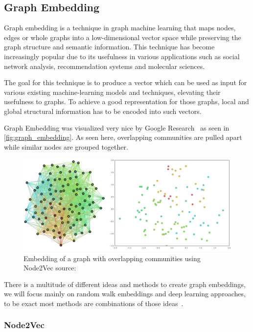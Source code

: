 \subsection{Graph Embedding}
Graph embedding is a technique in graph machine learning that maps nodes, edges or whole graphs into a low-dimensional vector space while preserving the graph structure and semantic information. This technique has become increasingly popular due to its usefulness in various applications such as social network analysis, recommendation systems and molecular sciences.

The goal for this technique is to produce a vector which can be used as input for various existing machine-learning models and techniques, elevating their usefulness to graphs. To achieve a good representation for those graphs, local and global structural information has to be encoded into such vectors.

Graph Embedding was visualized very nice by Google Research~\cite{epasto2019embedding} as seen in \autoref{fig:graph_embedding}. As seen here, overlapping communities are pulled apart while similar nodes are grouped together.

\begin{figure}[h!]
    \centering
    \includegraphics[scale=0.35]{tex/res/graph_embedding.png}
    \caption{Embedding of a graph with overlapping communities using Node2Vec \tiny{source: \cite{epasto2019embedding}}}
    \label{fig:graph_embedding}
\end{figure}

There is a multitude of different ideas and methods to create graph embeddings, we will focus mainly on random walk embeddings and deep learning approaches, to be exact most methods are combinations of those ideas~\cite{2017graph2vec,2016node2vec,2021graphormer}.
\subsubsection{Node2Vec}

